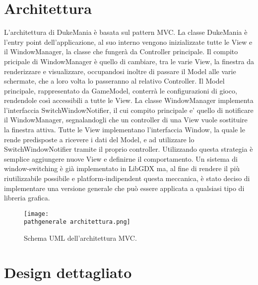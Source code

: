 \documentclass[a4paper,12pt]{report}
\newcommand\pathgenerale{img/generali/}
\begin{document}
\section{Architettura}
L'architettura di DukeMania è basata sul pattern MVC.
La classe DukeMania è l'entry point dell'applicazione, al suo interno vengono inizializzate tutte le View e il WindowManager, la classe che fungerà da Controller principale.
Il compito pricipale di WindowManager è quello di cambiare, tra le varie View, la finestra da renderizzare e visualizzare, occupandosi inoltre di passare il Model alle varie schermate, che a loro volta lo passeranno al relativo Controller.
Il Model principale, rappresentato da GameModel, conterrà le configurazioni di gioco, rendendole così accessibili a tutte le View.
La classe WindowManager implementa l'interfaccia SwitchWindowNotifier, il cui compito principale e' quello di notificare il WindowManager, segnalandogli che un controller di una View vuole sostituire la finestra attiva.
Tutte le View implementano l'interfaccia Window, la quale le rende predisposte a ricevere i dati del Model, e ad utilizzare lo SwitchWindowNotifier tramite il proprio controller.
Utilizzando questa strategia è semplice aggiungere nuove View e definirne il comportamento.
Un sistema di window-switching è già implementato in LibGDX ma, al fine di rendere il più riutilizzabile possibile e platform-indipendent 
questa meccanica, è stato deciso di implementare una versione generale che può essere applicata a qualsiasi tipo di libreria grafica.
\begin{figure}[!htb]
	\centerline{\texttt{[image: \\pathgenerale architettura.png]}}
	\caption{Schema UML dell'architettura MVC.}
	\label{img:architecture}
\end{figure}
\clearpage


\section{Design dettagliato}
\end{document}
